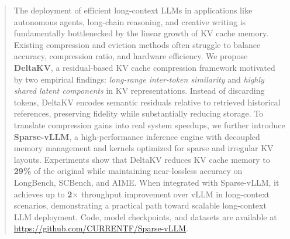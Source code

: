 \begin{abstract}
The deployment of efficient long-context LLMs in applications like autonomous agents, long-chain reasoning, and creative writing is fundamentally bottlenecked by the linear growth of KV cache memory. 
Existing compression and eviction methods often struggle to balance accuracy, compression ratio, and hardware efficiency.
We propose \textbf{DeltaKV}, a residual-based KV cache compression framework motivated by two empirical findings: \emph{long-range inter-token similarity} and \emph{highly shared latent components} in KV representations.
Instead of discarding tokens, DeltaKV encodes semantic residuals relative to retrieved historical references, preserving fidelity while substantially reducing storage.
To translate compression gains into real system speedups, we further introduce \textbf{Sparse-vLLM}, a high-performance inference engine with decoupled memory management and kernels optimized for sparse and irregular KV layouts.
Experiments show that DeltaKV reduces KV cache memory to \textbf{29\%} of the original while maintaining near-lossless accuracy on LongBench, SCBench, and AIME. When integrated with Sparse-vLLM, it achieves up to \textbf{2$\times$} throughput improvement over vLLM in long-context scenarios, demonstrating a practical path toward scalable long-context LLM deployment. Code, model checkpoints, and datasets are available at \url{https://github.com/CURRENTF/Sparse-vLLM}.
\end{abstract}


